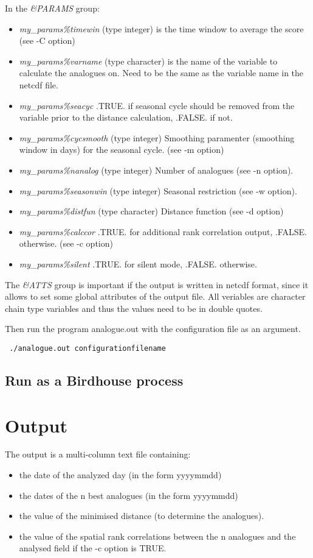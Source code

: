 \documentclass[11p,a4paper]{article}
\begin{document}
In the \textit{\&PARAMS} group:
\begin{itemize}
 \item \textit{my\_params\%timewin} (type integer) is the time window to average the score (see -C option)
 \item \textit{my\_params\%varname} (type character) is the name of the  variable  to calculate the analogues on. Need to be the same as the variable name in the netcdf file.
 \item \textit{my\_params\%seacyc} .TRUE. if seasonal cycle should be removed from the variable prior to the distance calculation, .FALSE. if not.
 \item \textit{my\_params\%cycsmooth} (type integer) Smoothing paramenter (smoothing window in days) for the seasonal cycle. (see -m option)
 \item \textit{my\_params\%nanalog} (type integer) Number of analogues (see -n option).
 \item \textit{my\_params\%seasonwin} (type integer) Seasonal restriction (see -w option).
 \item \textit{my\_params\%distfun} (type character) Distance function (see -d option)
 \item \textit{my\_params\%calccor} .TRUE. for additional rank correlation output, .FALSE. otherwise. (see -c option)
 \item \textit{my\_params\%silent} .TRUE. for silent mode, .FALSE. otherwise.
\end{itemize}

The \textit{\&ATTS} group is important if the output is written in netcdf format, since it allows to set some global attributes of the output file. All veriables are character chain type variables and thus the values need to be in double quotes.

Then run the program analogue.out with the configuration file as an argument.
\begin{verbatim}
 ./analogue.out configurationfilename
\end{verbatim}
\subsection{Run as a Birdhouse process}

\section{Output}
The output is a multi-column text file containing:
\begin{itemize}
 \item the date of the analyzed day (in the form yyyymmdd)
 \item the dates of the n best analogues (in the form yyyymmdd)
 \item the value of the minimised distance (to determine the analogues). 
 \item the value of the spatial rank correlations between the n analogues and the analysed field if the -c option is TRUE.
\end{itemize}
\end{document}
